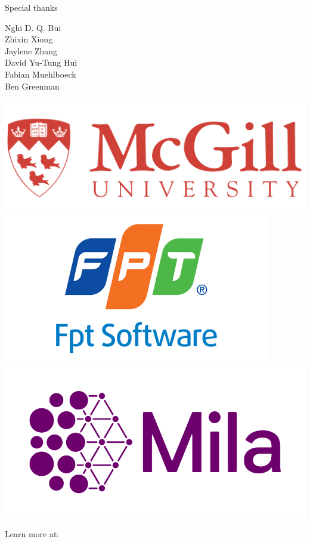 \documentclass{beamer}
\begin{document}
    \begin{frame}{Special thanks}
            \begin{center}
                \LARGE{
                    Nghi D. Q. Bui\\
                    Zhixin Xiong\\
                    Jaylene Zhang\\
                    David Yu-Tung Hui\\
                    Fabian Muehlboeck\\
                    Ben Greenman\\
                    \phantom{}\\
                }
                \href{https://cs.mcgill.ca}{\includegraphics[scale=0.08]{../figures/mcgill_logo.png}}
                \href{https://www.fpt-software.com}{\includegraphics[scale=0.19]{../figures/fpt_logo.png}}
                \href{https://mila.quebec}{\includegraphics[scale=0.13]{../figures/mila_logo.png}}
            \end{center}
    \end{frame}

    \begin{frame}
        \begin{center}
            \Huge{Learn more at: \\~\\
            \href{http://oplss22.ndan.co}{\color{blue}{http://oplss22.ndan.co}}}
        \end{center}
    \end{frame}
\end{document}
